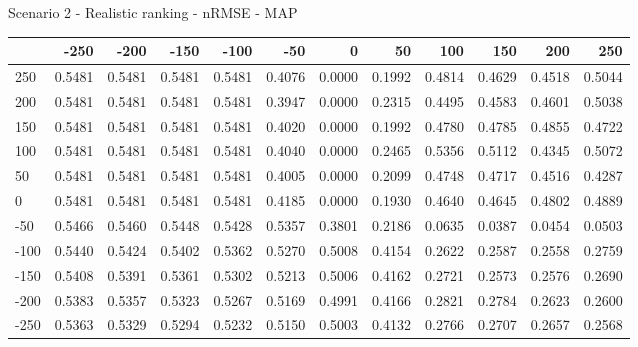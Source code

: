 Scenario 2 - Realistic ranking - nRMSE - MAP
\begin{tabular}{lrrrrrrrrrrr}
\toprule
{} &   -250 &   -200 &   -150 &   -100 &   -50  &    0   &    50  &    100 &    150 &    200 &    250 \\
\midrule
 250 & 0.5481 & 0.5481 & 0.5481 & 0.5481 & 0.4076 & 0.0000 & 0.1992 & 0.4814 & 0.4629 & 0.4518 & 0.5044 \\
 200 & 0.5481 & 0.5481 & 0.5481 & 0.5481 & 0.3947 & 0.0000 & 0.2315 & 0.4495 & 0.4583 & 0.4601 & 0.5038 \\
 150 & 0.5481 & 0.5481 & 0.5481 & 0.5481 & 0.4020 & 0.0000 & 0.1992 & 0.4780 & 0.4785 & 0.4855 & 0.4722 \\
 100 & 0.5481 & 0.5481 & 0.5481 & 0.5481 & 0.4040 & 0.0000 & 0.2465 & 0.5356 & 0.5112 & 0.4345 & 0.5072 \\
 50  & 0.5481 & 0.5481 & 0.5481 & 0.5481 & 0.4005 & 0.0000 & 0.2099 & 0.4748 & 0.4717 & 0.4516 & 0.4287 \\
 0   & 0.5481 & 0.5481 & 0.5481 & 0.5481 & 0.4185 & 0.0000 & 0.1930 & 0.4640 & 0.4645 & 0.4802 & 0.4889 \\
-50  & 0.5466 & 0.5460 & 0.5448 & 0.5428 & 0.5357 & 0.3801 & 0.2186 & 0.0635 & 0.0387 & 0.0454 & 0.0503 \\
-100 & 0.5440 & 0.5424 & 0.5402 & 0.5362 & 0.5270 & 0.5008 & 0.4154 & 0.2622 & 0.2587 & 0.2558 & 0.2759 \\
-150 & 0.5408 & 0.5391 & 0.5361 & 0.5302 & 0.5213 & 0.5006 & 0.4162 & 0.2721 & 0.2573 & 0.2576 & 0.2690 \\
-200 & 0.5383 & 0.5357 & 0.5323 & 0.5267 & 0.5169 & 0.4991 & 0.4166 & 0.2821 & 0.2784 & 0.2623 & 0.2600 \\
-250 & 0.5363 & 0.5329 & 0.5294 & 0.5232 & 0.5150 & 0.5003 & 0.4132 & 0.2766 & 0.2707 & 0.2657 & 0.2568 \\
\bottomrule
\end{tabular}

